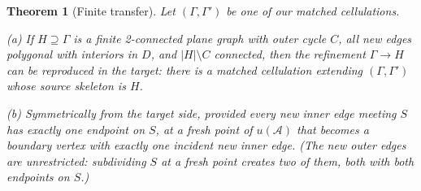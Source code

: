 \documentclass[11pt,a4paper]{article}
\theoremstyle{jsplain}
\newtheorem{theorem}{Theorem}[section]
\theoremstyle{jsdefn}
\begin{document}
\begin{theorem}[Finite transfer]\label{thm:transfer}
Let $(\Gamma,\Gamma')$ be one of our matched cellulations.

\textup{(a)} If $H\supseteq\Gamma$ is a finite 2-connected plane graph
with outer cycle $C$, all new edges polygonal with interiors in $D$,
and $|H|\setminus C$ connected, then the refinement $\Gamma\to H$ can
be reproduced in the target: there is a matched cellulation extending
$(\Gamma,\Gamma')$ whose source skeleton is $H$.

\textup{(b)} Symmetrically from the target side, provided every new
\emph{inner} edge meeting $S$ has exactly one endpoint on $S$, at a
fresh point of $u(\mathcal A)$ that becomes a boundary vertex with
exactly one incident new inner edge. \textup(The new \emph{outer} edges
are unrestricted: subdividing $S$ at a fresh point creates two of them,
both with both endpoints on $S$.\textup)
\end{theorem}
\end{document}

